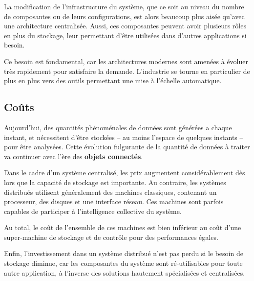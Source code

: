 La modification de l'infrastructure du système, que ce soit au niveau du nombre de composantes ou de leurs configurations, est alors beaucoup plus aisée qu'avec une architecture centralisée. Aussi, ces composantes peuvent avoir plusieurs rôles en plus du stockage, leur permettant d'être utilisées dans d'autres applications si besoin.

Ce besoin est fondamental, car les architectures modernes sont amenées à évoluer très rapidement pour satisfaire la demande. L'industrie se tourne en particulier de plus en plus vers des outils permettant une mise à l'échelle \og{}automatique\fg{}.

\subsection{Coûts}

Aujourd'hui, des quantités phénoménales de données sont générées a chaque instant, et nécessitent d'être stockées -- au moins l'espace de quelques instants -- pour être analysées. Cette évolution fulgurante de la quantité de données à traiter va continuer avec l'ère des \textbf{objets connectés}.

Dans le cadre d'un système centralisé, les prix augmentent considérablement dès lors que la capacité de stockage est importante. Au contraire, les systèmes distribués utilisent généralement des machines \og{}classiques\fg{}, \ie contenant un processeur, des disques et une interface réseau. Ces machines sont parfois capables de participer à l'intelligence collective du système.

Au total, le coût de l'ensemble de ces machines est bien inférieur au coût d'une \og{}super-machine\fg{} de stockage et de contrôle pour des performances égales. 

Enfin, l'investissement dans un système distribué n'est pas perdu si le besoin de stockage diminue, car les composantes du système sont ré-utilisables pour toute autre application, à l'inverse des solutions hautement spécialisées et centralisées.